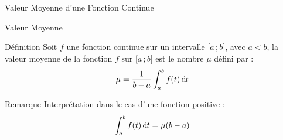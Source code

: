 \documentclass{coursbook}
\begin{document}
    \pagebreak
    \begin{Gpartie}{Valeur Moyenne d'une Fonction Continue} 
        \begin{Spartie}{Valeur Moyenne} 
            \begin{SSpartie}{Définition} 
                Soit $f$ une fonction continue sur un intervalle $\big[a\,; b\big]$, avec $a<b$, la valeur moyenne de la fonction $f$ sur $\big[a\,; b\big]$ est le nombre $\mu$ défini par : \vfill \[\mu=\frac{1}{b-a}\int_a^b f(t)\dt\]
                \vfill
            \end{SSpartie}
            \begin{SSpartie}{Remarque} 
                Interprétation dans le cas d'une fonction positive : \vfill \[\int_a^b f(t)\,\mathrm{d}\hspace*{-0.05em}t=\mu(b-a)\] \vfill
                \begin{center}
\end{center}
\end{SSpartie}
\end{Spartie}
\end{Gpartie}
\end{document}
